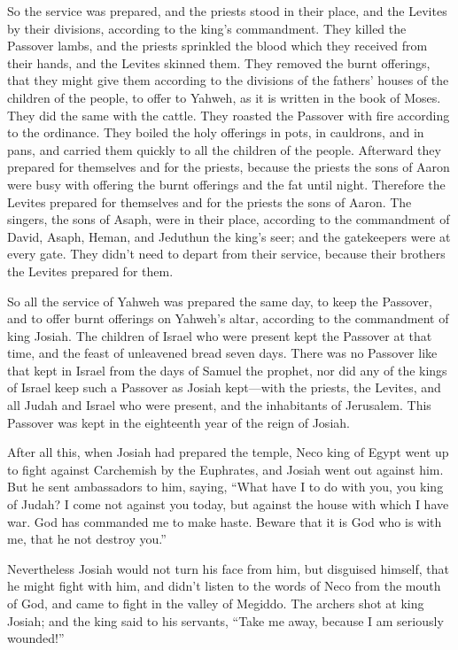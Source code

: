  So the service was prepared, and the priests stood in
their place, and the Levites by their divisions, according to the king's
commandment.  They killed the Passover lambs, and the
priests sprinkled the blood which they received from their hands, and
the Levites skinned them.  They removed the burnt
offerings, that they might give them according to the divisions of the
fathers' houses of the children of the people, to offer to Yahweh, as it
is written in the book of Moses. They did the same with the cattle.
 They roasted the Passover with fire according to the
ordinance. They boiled the holy offerings in pots, in cauldrons, and in
pans, and carried them quickly to all the children of the people.
 Afterward they prepared for themselves and for the
priests, because the priests the sons of Aaron were busy with offering
the burnt offerings and the fat until night. Therefore the Levites
prepared for themselves and for the priests the sons of Aaron.
 The singers, the sons of Asaph, were in their place,
according to the commandment of David, Asaph, Heman, and Jeduthun the
king's seer; and the gatekeepers were at every gate. They didn't need to
depart from their service, because their brothers the Levites prepared
for them.

 So all the service of Yahweh was prepared the same day, to
keep the Passover, and to offer burnt offerings on Yahweh's altar,
according to the commandment of king Josiah.  The children
of Israel who were present kept the Passover at that time, and the feast
of unleavened bread seven days.  There was no Passover like
that kept in Israel from the days of Samuel the prophet, nor did any of
the kings of Israel keep such a Passover as Josiah kept---with the
priests, the Levites, and all Judah and Israel who were present, and the
inhabitants of Jerusalem.  This Passover was kept in the
eighteenth year of the reign of Josiah.

 After all this, when Josiah had prepared the temple, Neco
king of Egypt went up to fight against Carchemish by the Euphrates, and
Josiah went out against him.  But he sent ambassadors to
him, saying, ``What have I to do with you, you king of Judah? I come not
against you today, but against the house with which I have war. God has
commanded me to make haste. Beware that it is God who is with me, that
he not destroy you.''

 Nevertheless Josiah would not turn his face from him, but
disguised himself, that he might fight with him, and didn't listen to
the words of Neco from the mouth of God, and came to fight in the valley
of Megiddo.  The archers shot at king Josiah; and the king
said to his servants, ``Take me away, because I am seriously wounded!''

